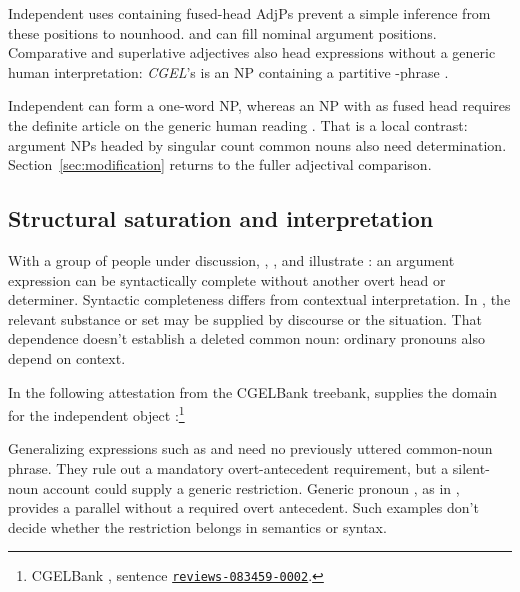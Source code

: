 \documentclass[12pt]{article}
\begin{document}
Independent uses containing fused-head AdjPs prevent a simple inference from these positions to nounhood.  and  can fill nominal argument positions. Comparative and superlative adjectives also head expressions without a generic human interpretation: \textit{CGEL}'s  is an NP containing a partitive -phrase \citep[332--333, 416--423]{huddleston2002}.

Independent  can form a one-word NP, whereas an NP with  as fused head requires the definite article  on the generic human reading \citep[417--418]{huddleston2002}. That is a local contrast: argument NPs headed by singular count common nouns also need determination. Section~\ref{sec:modification} returns to the fuller adjectival comparison.

\subsection{Structural saturation and interpretation}\label{sec:saturation}

With a group of people under discussion, , , and  illustrate : an argument expression can be syntactically complete without another overt head or determiner. Syntactic completeness differs from contextual interpretation. In , the relevant substance or set may be supplied by discourse or the situation. That dependence doesn't establish a deleted common noun: ordinary pronouns also depend on context.

In the following attestation from the CGELBank treebank,  supplies the domain for the independent object :\footnote{CGELBank \citep{reynolds2023unified}, sentence \href{https://github.com/nert-nlp/cgel/blob/d0a2c2d8c522b23d5aa879fc9cb94948f4285b2c/datasets/ewt.cgel\#L651-L654}{\nolinkurl{reviews-083459-0002}}.}
\ea\label{ex:attested-both}
\z

Generalizing expressions such as  and  need no previously uttered common-noun phrase. They rule out a mandatory overt-antecedent requirement, but a silent-noun account could supply a generic restriction. Generic pronoun , as in , provides a parallel without a required overt antecedent. Such examples don't decide whether the restriction belongs in semantics or syntax.
\end{document}
